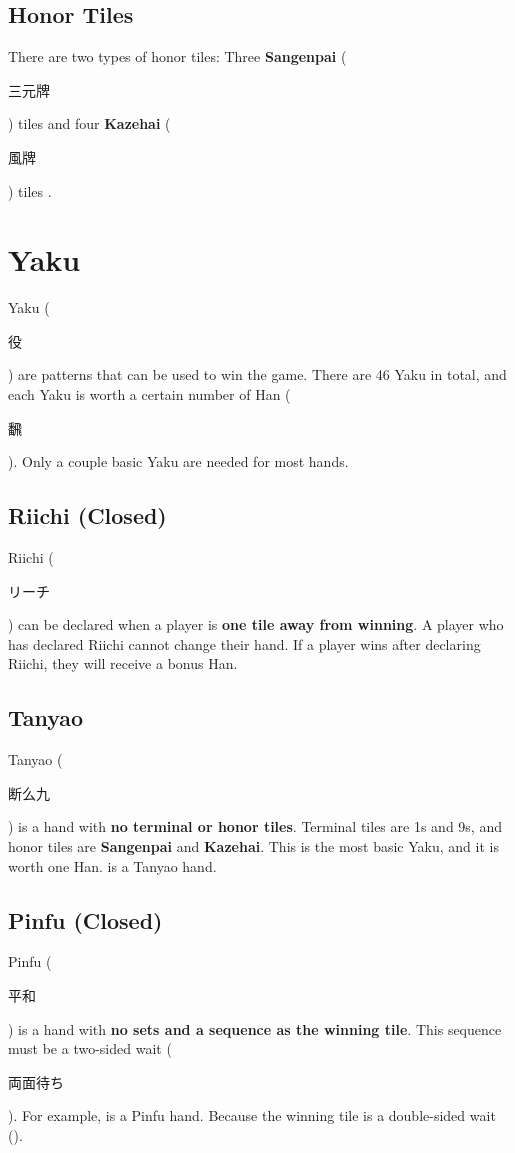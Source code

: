 \documentclass[8pt,landscape]{article}
\begin{document}
\begin{minipage}[t][.8\textheight][t]{\textwidth}
\begin{multicols*}{3}
    \subsection{Honor Tiles}
    There are two types of honor tiles:
    Three \textbf{Sangenpai} (\begin{CJK}{UTF8}{min}三元牌\end{CJK}) tiles  and four \textbf{Kazehai} (\begin{CJK}{UTF8}{min}風牌\end{CJK}) tiles .

    \section{Yaku}
    Yaku (\begin{CJK}{UTF8}{min}役\end{CJK}) are patterns that can be used to win the game.
    There are 46 Yaku in total, and each Yaku is worth a certain number of Han (\begin{CJK}{UTF8}{min}飜\end{CJK}).
    Only a couple basic Yaku are needed for most hands.

    \subsection{Riichi (Closed)}
    Riichi (\begin{CJK}{UTF8}{min}リーチ\end{CJK}) can be declared when a player is \textbf{one tile away from winning}.
    A player who has declared Riichi cannot change their hand.
    If a player wins after declaring Riichi, they will receive a bonus Han.

    \subsection{Tanyao}
    Tanyao (\begin{CJK}{UTF8}{min}断么九\end{CJK}) is a hand with \textbf{no terminal or honor tiles}.
    Terminal tiles are 1s and 9s, and honor tiles are \textbf{Sangenpai} and \textbf{Kazehai}.
    This is the most basic Yaku, and it is worth one Han.
     is a Tanyao hand.

    \subsection{Pinfu (Closed)}
    Pinfu (\begin{CJK}{UTF8}{min}平和\end{CJK}) is a hand with \textbf{no sets and a sequence as the winning tile}.
    This sequence must be a two-sided wait (\begin{CJK}{UTF8}{min}両面待ち\end{CJK}).
    For example,  is a Pinfu hand. Because the winning tile is a double-sided wait ().


\end{multicols*}
\end{minipage}
\end{document}

